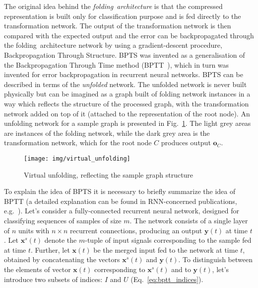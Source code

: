 The original idea behind the \emph{folding~architecture} is that the compressed representation is built only for classification purpose and is fed directly to the transformation network. The output of the transformation network is then compared with the expected output and the error can be backpropagated through the folding~architecture network by using a gradient-descent procedure, Backpropagation Through Structure. BPTS was invented as a generalisation of the Backpropagation Through Time method (BPTT~\cite{pineda1987generalization}), which in turn was invented for error backpropagation in recurrent neural networks. BPTS can be described in terms of the \emph{unfolded} network. The unfolded network is never built physically but can be imagined as a graph built of folding network instances in a way which reflects the structure of the processed graph, with the transformation network added on top of it (attached to the representation of the root node). An unfolding network for a sample graph is presented in Fig.~\ref{fig:virtual_unfolding}. The light grey areas are instances of the folding network, while the dark grey area is the transformation network, which for the root node $C$ produces output $\bm{o}_C$.

\begin{figure}
\begin{center}
	\texttt{[image: img/virtual\_unfolding]}
	\caption{Virtual unfolding, reflecting the sample graph structure}
	\label{fig:virtual_unfolding}
\end{center}
\end{figure}

To explain the idea of BPTS it is necessary to briefly summarize the idea of BPTT (a detailed explanation can be found in RNN-concerned publications, e.g.~\cite{williams1995gradient}). Let's consider a fully-connected recurrent neural network, designed for classifying sequences of samples of size $m$. The network consists of a single layer of $n$ units with $n \times n$ recurrent connections, producing an output $\bm{y}(t)$ at time $t$. Let $\bm{x}^{s}(t)$ denote the $m$-tuple of input signals corresponding to the sample fed at time $t$. Further, let $\bm{x}(t)$ be the merged input fed to the network at time $t$, obtained by concatenating the vectors $\bm{x}^{s}(t)$ and $\bm{y}(t)$. To distinguish between the elements of vector $\bm{x}(t)$ corresponding to $\bm{x}^{s}(t)$ and to $\bm{y}(t)$, let's introduce two subsets of indices: $I$ and $U$ (Eq.~\ref{eq:bptt_indices}).

